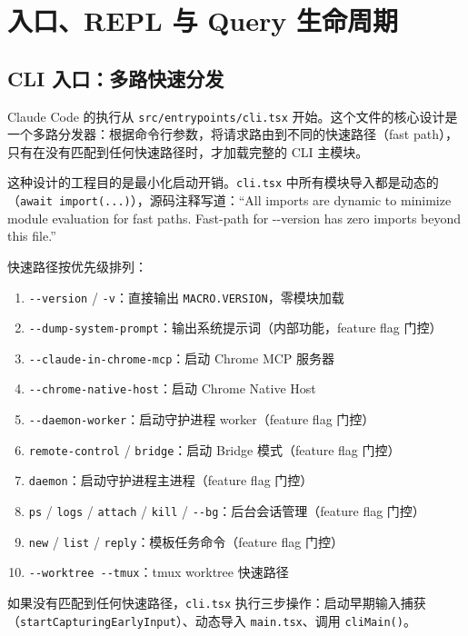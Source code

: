 \chapter{入口、REPL 与 Query 生命周期}

\section{CLI 入口：多路快速分发}

Claude Code 的执行从 \texttt{src/entrypoints/cli.tsx} 开始。这个文件的核心设计是一个多路分发器：根据命令行参数，将请求路由到不同的快速路径（fast path），只有在没有匹配到任何快速路径时，才加载完整的 CLI 主模块。

这种设计的工程目的是最小化启动开销。\texttt{cli.tsx} 中所有模块导入都是动态的（\texttt{await import(...)}），源码注释写道：``All imports are dynamic to minimize module evaluation for fast paths. Fast-path for -{}-version has zero imports beyond this file.''

快速路径按优先级排列：

\begin{enumerate}
  \item \texttt{-{}-version} / \texttt{-v}：直接输出 \texttt{MACRO.VERSION}，零模块加载
  \item \texttt{-{}-dump-system-prompt}：输出系统提示词（内部功能，feature flag 门控）
  \item \texttt{-{}-claude-in-chrome-mcp}：启动 Chrome MCP 服务器
  \item \texttt{-{}-chrome-native-host}：启动 Chrome Native Host
  \item \texttt{-{}-daemon-worker}：启动守护进程 worker（feature flag 门控）
  \item \texttt{remote-control} / \texttt{bridge}：启动 Bridge 模式（feature flag 门控）
  \item \texttt{daemon}：启动守护进程主进程（feature flag 门控）
  \item \texttt{ps} / \texttt{logs} / \texttt{attach} / \texttt{kill} / \texttt{-{}-bg}：后台会话管理（feature flag 门控）
  \item \texttt{new} / \texttt{list} / \texttt{reply}：模板任务命令（feature flag 门控）
  \item \texttt{-{}-worktree -{}-tmux}：tmux worktree 快速路径
\end{enumerate}

如果没有匹配到任何快速路径，\texttt{cli.tsx} 执行三步操作：启动早期输入捕获（\texttt{startCapturingEarlyInput}）、动态导入 \texttt{main.tsx}、调用 \texttt{cliMain()}。

